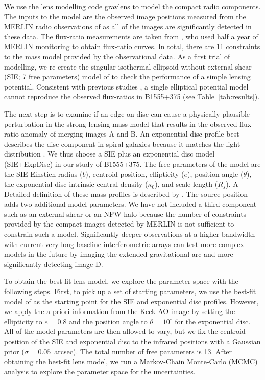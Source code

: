 \documentclass[a4paper,fleqn,usenatbib,useAMS]{mnras}
\begin{document}
We use the lens modelling code {\sc gravlens} \citep{Kee01} to model the compact radio components. The inputs to the model are the observed image positions measured from the MERLIN radio observations of \citet{Marlow99} as all of the images are significantly detected in these data. The flux-ratio measurements are taken from \citet{K03}, who used half a year of MERLIN monitoring to obtain flux-ratio curves. In total, there are 11 constraints to the mass model provided by the observational data. As a first trial of modelling, we re-create the singular isothermal ellipsoid without external shear (SIE; 7 free parameters) model of \citet{Marlow99} to check the performance of a simple lensing potential. Consistent with previous studies \citep{Marlow99,Xu15}, a single elliptical potential model cannot reproduce the observed flux-ratios in B1555+375 (see Table~\ref{tab:results}). 

The next step is to examine if an edge-on disc can cause a physically plausible perturbation in the strong lensing mass model that results in the observed flux ratio anomaly of  merging images A and B. An exponential disc profile best describes the disc component in spiral galaxies because it matches the light distribution \citep{Kee98}. We thus choose a SIE plus an exponential disc model (SIE+ExpDisc) in our study of B1555+375. The free parameters of the model are the SIE Einstien radius ($b$), centroid position, ellipticity ($e$), position angle ($\theta$), the exponential disc intrinsic central density ($\kappa_0$), and scale length ($R_s$). A Detailed definition of these mass profiles is described by \citet{Kee01}. The source position adds two additional model parameters. We have not included a third component such as an external shear or an NFW halo because the number of constraints provided by the compact images detected by MERLIN is not sufficient to constrain such a model. Significantly deeper observations at a higher bandwidth with current very long baseline interferometric arrays can test more complex models in the future by imaging the extended gravitational arc and more significantly detecting image D. 

To obtain the best-fit lens model, we explore the parameter space with the following steps. First, to pick up a set of starting parameters, we use the best-fit model of \citet{Marlow99} as the starting point for the SIE and exponential disc profiles. However, we apply the a priori information from the Keck AO image by setting the ellipticity to $e=0.8$ and the position angle to $\theta=10^\circ$ for the exponential disc. All of the model parameters are then allowed to vary, but we fix the centroid position of the SIE and exponential disc to the infrared positions with a Gaussian prior ($\sigma = 0.05 $~arcsec). The total number of free parameters is 13. After obtaining the best-fit lens model, we run a Markov-Chain Monte-Carlo (MCMC) analysis to explore the parameter space for the uncertainties.
\end{document}
